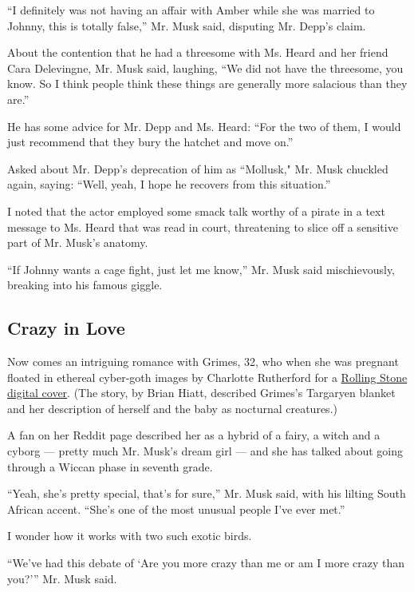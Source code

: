 ``I definitely was not having an affair with Amber while she was married
to Johnny, this is totally false,'' Mr. Musk said, disputing Mr. Depp's
claim.

About the contention that he had a threesome with Ms. Heard and her
friend Cara Delevingne, Mr. Musk said, laughing, ``We did not have the
threesome, you know. So I think people think these things are generally
more salacious than they are.''

He has some advice for Mr. Depp and Ms. Heard: ``For the two of them, I
would just recommend that they bury the hatchet and move on.''

Asked about Mr. Depp's deprecation of him as ``Mollusk," Mr. Musk
chuckled again, saying: ``Well, yeah, I hope he recovers from this
situation.''

I noted that the actor employed some smack talk worthy of a pirate in a
text message to Ms. Heard that was read in court, threatening to slice
off a sensitive part of Mr. Musk's anatomy.

``If Johnny wants a cage fight, just let me know,'' Mr. Musk said
mischievously, breaking into his famous giggle.

\hypertarget{crazy-in-love}{%
\subsection{Crazy in Love}\label{crazy-in-love}}

Now comes an intriguing romance with Grimes, 32, who when she was
pregnant floated in ethereal cyber-goth images by Charlotte Rutherford
for a
\href{https://www.rollingstone.com/music/music-features/grimes-rolling-stone-digital-cover-960843/}{Rolling
Stone digital cover}. (The story, by Brian Hiatt, described Grimes's
Targaryen blanket and her description of herself and the baby as
nocturnal creatures.)

A fan on her Reddit page described her as a hybrid of a fairy, a witch
and a cyborg --- pretty much Mr. Musk's dream girl --- and she has
talked about going through a Wiccan phase in seventh grade.

``Yeah, she's pretty special, that's for sure,'' Mr. Musk said, with his
lilting South African accent. ``She's one of the most unusual people
I've ever met.''

I wonder how it works with two such exotic birds.

``We've had this debate of `Are you more crazy than me or am I more
crazy than you?''' Mr. Musk said.

